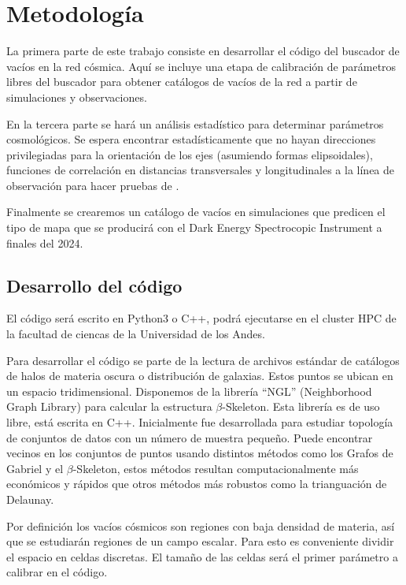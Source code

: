 \documentclass[preprint]{aastex62}
\begin{document}
  \section{Metodología}

  La primera parte de este trabajo consiste en desarrollar el código del buscador de vacíos
  en la red cósmica. Aquí se incluye una etapa de calibración de parámetros libres del buscador
  para obtener catálogos de vacíos de la red a partir de simulaciones y observaciones.
   

  En la tercera parte se hará un análisis estadístico para determinar parámetros cosmológicos.
  Se espera encontrar estadísticamente que no hayan direcciones privilegiadas para la orientación
  de los ejes (asumiendo formas elipsoidales), funciones de correlación en distancias transversales
  y longitudinales a la línea de observación para hacer pruebas de
  \citet{AlcockPaczynski1979}. 
  
  Finalmente se crearemos un cat\'alogo de vac\'ios en simulaciones
  que predicen el tipo de mapa que se producir\'a con el Dark Energy
  Spectrocopic Instrument a finales del 2024. 

  \subsection{Desarrollo del código}

  El código será escrito en Python3 o C++, podrá ejecutarse en el
  cluster HPC de la facultad de ciencas de la Universidad de los Andes.
  
  Para desarrollar el código se parte de la lectura de archivos estándar de catálogos de halos
  de materia oscura o distribución de galaxias. Estos puntos se ubican en un espacio tridimensional.
  Disponemos de la librería ``NGL''\citep{ngl} (Neighborhood Graph Library)
  para calcular la estructura $\beta$-Skeleton. Esta librería es de uso libre, está escrita en C++.
  Inicialmente fue desarrollada para estudiar topología de conjuntos de datos con un número de muestra
  pequeño. Puede encontrar vecinos en los conjuntos de puntos usando distintos métodos como los
  Grafos de Gabriel y el $\beta$-Skeleton, estos métodos resultan computacionalmente más económicos
  y rápidos que otros métodos más robustos como la trianguación de Delaunay.
  
  Por definición los vacíos cósmicos son regiones con baja densidad de materia, así que se
  estudiarán regiones de un campo escalar. Para esto es conveniente dividir el espacio en
  celdas discretas. El tamaño de las celdas será el primer parámetro a calibrar en el código.
  
\end{document}
